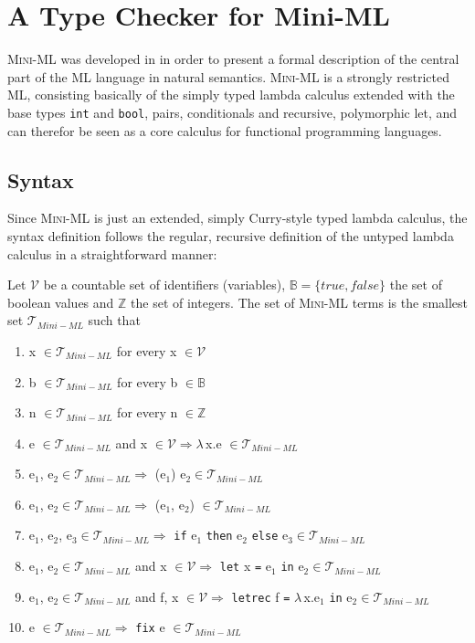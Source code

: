 \section{A Type Checker for Mini-ML}

\textsc{Mini-ML} was developed in \cite{MiniML86} in order to present
a formal description of the central part of the \textsc{ML} language
in natural semantics. \textsc{Mini-ML} is a strongly restricted
\textsc{ML}, consisting basically of the simply typed lambda calculus
extended with the base types \texttt{int} and \texttt{bool}, pairs,
conditionals and recursive, polymorphic let, and can therefor be seen
as a core calculus for functional programming languages.

\subsection{Syntax}

Since \textsc{Mini-ML} is just an extended, simply Curry-style typed
lambda calculus, the syntax definition follows the regular, recursive
definition of the untyped lambda calculus in a straightforward manner:

\bigskip Let $\mathcal{V}$ be a countable set of identifiers
(variables), $\mathbb{B} = \{ true,false \}$ the set of boolean values
and $\mathbb{Z}$ the set of integers. The set of \textsc{Mini-ML}
terms is the smallest set $\mathcal{T}_{Mini-ML}$ such that
\begin{enumerate}
\item x $\in \mathcal{T}_{Mini-ML}$ for every x $\in \mathcal{V}$
\item b $\in \mathcal{T}_{Mini-ML}$ for every b $\in \mathbb{B}$
\item n $\in \mathcal{T}_{Mini-ML}$ for every n $\in \mathbb{Z}$
\item e $\in \mathcal{T}_{Mini-ML}$ and x $\in \mathcal{V} \Rightarrow
  \lambda\, $x.e $\in \mathcal{T}_{Mini-ML}$
\item e$_{1}$, e$_{2} \in \mathcal{T}_{Mini-ML} \Rightarrow$ (e$_{1}$)
  e$_{2} \in \mathcal{T}_{Mini-ML}$
\item e$_{1}$, e$_{2} \in \mathcal{T}_{Mini-ML} \Rightarrow$ (e$_{1}$,
  e$_{2}$) $\in \mathcal{T}_{Mini-ML}$
\item e$_{1}$, e$_{2}$, e$_{3} \in \mathcal{T}_{Mini-ML} \Rightarrow$
  \texttt{if} e$_{1}$ \texttt{then} e$_{2}$ \texttt{else} e$_{3} \in
  \mathcal{T}_{Mini-ML}$
\item e$_{1}$, e$_{2} \in \mathcal{T}_{Mini-ML}$ and x $\in
  \mathcal{V} \Rightarrow$ \texttt{let} x \texttt{=} e$_{1}$
  \texttt{in} e$_{2} \in \mathcal{T}_{Mini-ML}$
\item e$_{1}$, e$_{2} \in \mathcal{T}_{Mini-ML}$ and f, x $\in
  \mathcal{V} \Rightarrow$ \texttt{letrec} f \texttt{=} $\lambda\,
  $x.e$_{1}$ \texttt{in} e$_{2} \in \mathcal{T}_{Mini-ML}$
\item e $\in \mathcal{T}_{Mini-ML} \Rightarrow$ \texttt{fix} e $\in
  \mathcal{T}_{Mini-ML}$
\end{enumerate}

